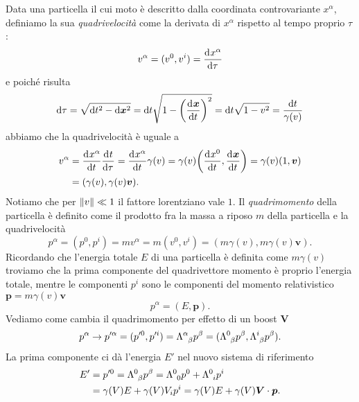 Data una particella il cui moto è descritto dalla coordinata controvariante
$x^{\alpha}$, definiamo la sua \emph{quadrivelocità} come
la derivata di $x^{\alpha}$ rispetto al tempo proprio $\tau$:
\begin{equation}
  v^{\alpha} = (v^{0}, v^{i}) =\frac{{\mathop{}\!\mathrm{d}^{}}x^{\alpha}}{\mathop{}\!\mathrm{d} {\tau}^{}}
\end{equation}
e poiché risulta
\begin{equation}
  \dd \tau = \sqrt{\dd t^{2} - \dd \bm{x}^{2}} = \dd t \sqrt{1 -
    \bigg(\toder{\bm{x}}{t}\bigg)^{2}} = \dd t\sqrt{1 - v^{2}} = \frac{\dd
    t}{\gamma(v)}
\end{equation}
abbiamo che la quadrivelocità è uguale a
\begin{equation}
  \begin{split}
    v^{\alpha} &= \toder{x^{\alpha}}{t}\toder{t}{\tau} = \toder{x^{\alpha}}{t}
    \gamma(v) = \gamma(v) \bigg(\toder{x^{0}}{t}, \toder{\bm{x}}{t}\bigg) =
    \gamma(v)(1,\bm{v}) \\
    &= (\gamma(v), \gamma(v)\bm{v}).
  \end{split}
\end{equation}
Notiamo che per $\lVert v\rVert \ll 1$ il fattore lorentziano vale $1$.  Il
\emph{quadrimomento} della particella è definito come il
prodotto fra la massa a riposo $m$ della particella e la quadrivelocità
\begin{equation}
  p^{\alpha} = (p^{0},p^{i}) = m v^{\alpha} = m (v^{0}, v^{i}) = (m\gamma(v),
  m\gamma(v)\bm{v}).
\end{equation}
Ricordando che l'energia totale $E$ di una particella è definita come
$m\gamma(v)$ troviamo che la prima componente del quadrivettore momento è
proprio l'energia totale, mentre le componenti $p^{i}$ sono le componenti del
momento relativistico $\bm{p} = m\gamma(v)\bm{v}$
\begin{equation}
  p^{\alpha} = (E, \bm{p}).
\end{equation}
Vediamo come cambia il quadrimomento per effetto di un boost $\bm{V}$
\begin{equation}
  p^{\alpha} \to p'^{\alpha} = (p'^{0}, p'^{i}) =
  \tensor{\Lambda}{^{\alpha}_{\beta}} p^{\beta} =
  (\tensor{\Lambda}{^{0}_{\beta}}p^{\beta},
  \tensor{\Lambda}{^{i}_{\beta}}p^{\beta}).
\end{equation}
La prima componente ci dà l'energia $E'$ nel nuovo sistema di riferimento
\begin{equation}
  \begin{split}
    E' &= p'^{0} = \tensor{\Lambda}{^{0}_{\beta}}p^{\beta} =
    \tensor{\Lambda}{^{0}_{0}}p^{0} + \tensor{\Lambda}{^{0}_{i}}p^{i} \\
    &= \gamma(V) E + \gamma(V) V_{i}p^{i} = \gamma(V) E + \gamma(V)
    \bm{V}\cdot\bm{p}.
  \end{split}
\end{equation}
